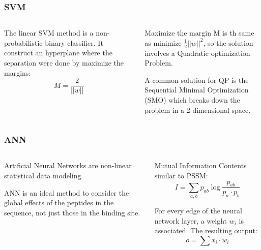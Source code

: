 \documentclass[presentation]{beamer}   %
\begin{document}
\begin{frame}
 \frametitle{SVM}
 
 \begin{columns}
  \begin{column}{5cm}
   \begin{block}\centering
    The linear SVM method is a non-probabilistic binary classifier.
    It construct an hyperplane where the separation were done by maximize the margins:
    \begin{equation}
     M = \frac{2}{||w||}
    \end{equation}
   \end{block}
   \pause
  \end{column}
  \begin{column}{5cm}
   \begin{block}\centering
    Maximize the margin M is th same as minimize $ \frac{1}{2}||w||^{2}$, 
    so the solution involves a Quadratic optimization Problem.
   \end{block} 
   \begin{block}\centering
    A common solution for QP is the Sequential Minimal Optimization (SMO)
    which breaks down the problem in a 2-dimensional space. 
   \end{block}
  \end{column}
 \end{columns}
\end{frame}

\begin{frame}
 \frametitle{ANN}
 
  \begin{columns}
  \begin{column}{5cm}
   \begin{block}\centering
    Artificial Neural Networks are non-linear statistical data modeling
   \end{block}
   \pause
   \begin{block}\centering
    ANN is an ideal method to consider the global effects of the 
    peptides in the sequence, not just those in the binding site. 
   \end{block}
   \pause
  \end{column}
  \begin{column}{5cm}
   \begin{block}\centering
    Mutual Information Contents similar to PSSM:
    \begin{equation}
     I = \sum_{a,b}{ p_{ab}\log{ \frac{ p_{ab} }{ p_a \cdot p_b } } }
    \end{equation}
   \end{block}
   \pause
   \begin{block}\centering
   For every edge of the neural network layer, a weight $w_i$ is associated. The resulting output:
    \begin{equation}
     o = \sum{x_i \cdot w_i}
    \end{equation}
   \end{block}
  \end{column}
 \end{columns}
\end{frame}
\end{document}
